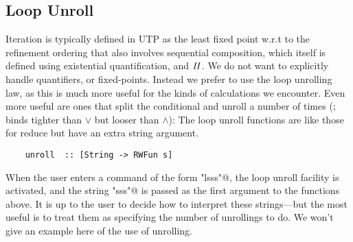 \subsection{Loop Unroll}


Iteration is typically defined in UTP as the least fixed point
w.r.t to the refinement ordering
that also involves sequential composition,
which itself is defined using existential quantification,
and $\mathit{II}$.
We do not want to explicitly handle quantifiers,
or fixed-points.
Instead we prefer to use the loop unrolling law,
as this is much more useful for the kinds of calculations we encounter.
Even more useful are ones that split the conditional
and unroll a number of times ($\mathrel{;}$ binds tighter than $\lor$
but looser than $\land$):
The loop unroll functions are like those for reduce
but have an extra string argument.
\begin{verbatim}
    unroll  :: [String -> RWFun s]
\end{verbatim}
When the user enters a command of the form \verb@"lsss"@,
the loop unroll facility is activated,
and the string \verb@"sss"@ is passed as the first argument to the functions
above. It is up to the user to decide how to interpret
these strings---but the most useful is to treat them as specifying
the number of unrollings to do.
We won't give an example here of the use of unrolling.
%
%
%
